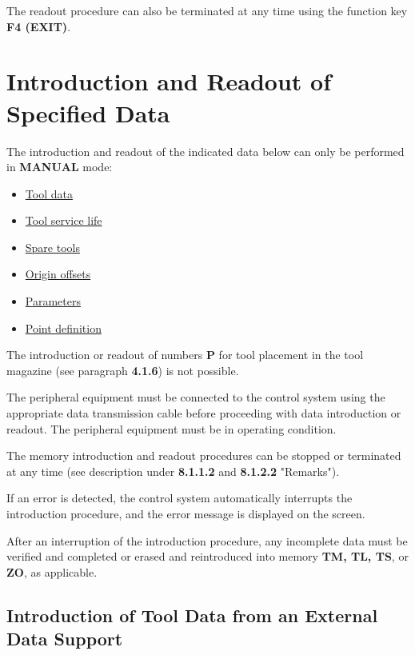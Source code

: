 The readout procedure can also be terminated at any time using the function key \textbf{F4 (EXIT)}.

\section{Introduction and Readout of Specified Data}

The introduction and readout of the indicated data below can only be performed in \textbf{MANUAL} mode:

\begin{itemize}
    \item \underline{Tool data}
    \item \underline{Tool service life}
    \item \underline{Spare tools}
    \item \underline{Origin offsets}
    \item \underline{Parameters}
    \item \underline{Point definition}
\end{itemize}

The introduction or readout of numbers \textbf{P} for tool placement in the tool magazine (see paragraph \textbf{4.1.6}) is not possible.

The peripheral equipment must be connected to the control system using the appropriate data transmission cable before proceeding with data introduction or readout.  
The peripheral equipment must be in operating condition.

The memory introduction and readout procedures can be stopped or terminated at any time  
(see description under \textbf{8.1.1.2} and \textbf{8.1.2.2} "Remarks").

If an error is detected, the control system automatically interrupts the introduction procedure, and the error message is displayed on the screen.

After an interruption of the introduction procedure, any incomplete data must be verified and completed or erased and reintroduced into memory \textbf{TM, TL, TS}, or \textbf{ZO}, as applicable.

\newpage

\subsection{Introduction of Tool Data from an External Data Support}

\begin{itemize}
\end{itemize}

